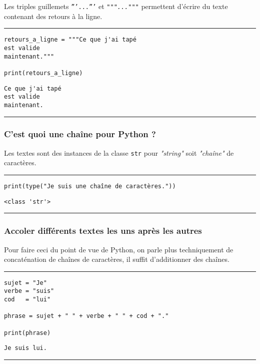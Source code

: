 Les triples guillemets \texttt{'''...'''} et \texttt{\textit{""}\textit{"..."}\textit{""}} permettent d'écrire du texte contenant des retours à la ligne.


\bigskip
{\hrule height .5mm}
\begin{verbatim}
retours_a_ligne = """Ce que j'ai tapé
est valide
maintenant."""

print(retours_a_ligne)
\end{verbatim}
 \color{ForestGreen}
\vspace{-1.5em}
\begin{verbatim}
Ce que j'ai tapé
est valide
maintenant.
\end{verbatim} \color{Black}
{\hrule height .5mm}
\bigskip


\subsubsection{C'est quoi une chaîne pour Python ?}

Les textes sont des instances de la classe \texttt{str} pour \textit{"string"} soit \textit{"chaîne"} de caractères.


\bigskip
{\hrule height .5mm}
\begin{verbatim}
print(type("Je suis une chaîne de caractères."))
\end{verbatim}
 \color{ForestGreen}
\vspace{-1.5em}
\begin{verbatim}
<class 'str'>
\end{verbatim} \color{Black}
{\hrule height .5mm}
\bigskip


\subsubsection{Accoler différents textes les uns après les autres}

Pour faire ceci du point de vue de Python, on parle plus techniquement de concaténation de chaînes de caractères, il suffit d'additionner des chaînes.


\bigskip
{\hrule height .5mm}
\begin{verbatim}
sujet = "Je"
verbe = "suis"
cod   = "lui"

phrase = sujet + " " + verbe + " " + cod + "."

print(phrase)
\end{verbatim}
 \color{ForestGreen}
\vspace{-1.5em}
\begin{verbatim}
Je suis lui.
\end{verbatim} \color{Black}
{\hrule height .5mm}
\bigskip


